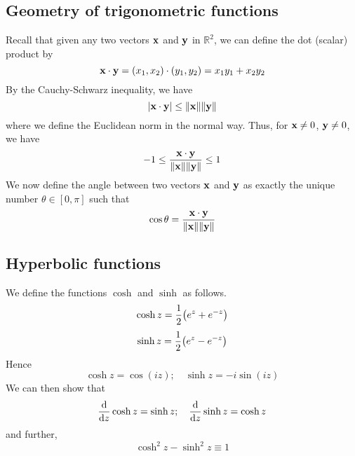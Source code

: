 \subsection{Geometry of trigonometric functions}
Recall that given any two vectors \(\vb x\) and \(\vb y\) in \(\mathbb R^2\), we can define the dot (scalar) product by
\[
	\vb x \cdot \vb y = (x_1, x_2) \cdot (y_1, y_2) = x_1y_1 + x_2y_2
\]
By the Cauchy-Schwarz inequality, we have
\[
	\abs{\vb x \cdot \vb y} \leq \norm{\vb x} \norm{\vb y}
\]
where we define the Euclidean norm in the normal way.
Thus, for \(\vb x \neq 0\), \(\vb y \neq 0\), we have
\[
	-1 \leq \frac{\vb x \cdot \vb y}{\norm{\vb x} \norm{\vb y}} \leq 1
\]
We now define the angle between two vectors \(\vb x\) and \(\vb y\) as exactly the unique number \(\theta \in [0, \pi]\) such that
\[
	\cos\theta = \frac{\vb x \cdot \vb y}{\norm{\vb x} \norm{\vb y}}
\]

\subsection{Hyperbolic functions}
We define the functions \(\cosh\) and \(\sinh\) as follows.
\[
	\cosh z = \frac{1}{2}\qty(e^z + e^{-z})
\]
\[
	\sinh z = \frac{1}{2}\qty(e^z - e^{-z})
\]
Hence
\[
	\cosh z = \cos(iz);\quad \sinh z = -i\sin(iz)
\]
We can then show that
\[
	\dv{z} \cosh z = \sinh z;\quad \dv{z} \sinh z = \cosh z
\]
and further,
\[
	\cosh^2 z - \sinh^2 z \equiv 1
\]

